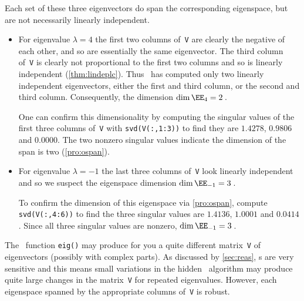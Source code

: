 \begin{example}
\begin{solution}
Each set of these three eigenvectors do span the corresponding eigenspace, but are not necessarily linearly independent.
\begin{itemize}
\item For eigenvalue \(\lambda=4\) the first two columns of~\verb|V| are clearly the negative of each other, and so are essentially the same eigenvector.  
The third column of~\verb|V| is clearly not proportional to the first two columns and so is linearly independent (\autoref{thm:lindeplc}).
Thus \script\ has computed only two linearly independent eigenvectors, either the first and third column, or the second and third column.
Consequently, the dimension \(\dim\EE_4=2\)\,.

One can confirm this dimensionality by computing the singular values 
of the first three columns of~\verb|V| with \verb|svd(V(:,1:3))| to find they are \(1.4278\), \(0.9806\) and \(0.0000\).
The two nonzero singular values indicate the dimension of the span is two (\autoref{pro:ospan}).

\item For eigenvalue \(\lambda=-1\) the last three columns of~\verb|V| look linearly independent and so we suspect the eigenspace dimension \(\dim\EE_{-1}=3\)\,.

To confirm the dimension of this eigenspace via \autoref{pro:ospan}, compute \verb|svd(V(:,4:6))| to find the three singular values are \(1.4136\), \(1.0001\) and \(0.0414\).
Since all three singular values are nonzero, \(\dim\EE_{-1}=3\)\,.
\end{itemize}
\end{solution}
The \script\ function \verb|eig()| may produce for you a quite different matrix~\verb|V| of eigenvectors (possibly with complex parts). 
As discussed by \autoref{sec:reas}, s are very sensitive and this  means small variations in the hidden \script\ algorithm may produce quite large changes in the matrix~\verb|V| for repeated eigenvalues.
However, each eigenspace spanned by the appropriate columns of~\verb|V| is robust.
\end{example}

